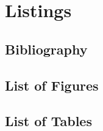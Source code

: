 \chapter{Listings}\label{chap.verzeichnisse}
\section{Bibliography}
\begingroup
\def\chapter*#1{}


\clearpage
\section{List of Figures}
\listoffigures

\clearpage
\section{List of Tables}
\listoftables
\endgroup